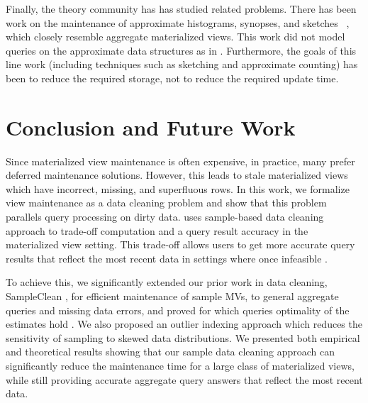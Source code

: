 Finally, the theory community has has studied related problems.
There has been work on the maintenance of approximate histograms, synopses, and sketches ~\cite{gibbons1997fast, DBLP:journals/ftdb/CormodeGHJ12}, which closely resemble aggregate materialized views.
This work did not model queries on the approximate data structures as in \svc.
Furthermore, the goals of this line work (including techniques such as sketching and approximate counting) has been to reduce the required storage, not to reduce the required update time.

\vspace{-1em}
\section{Conclusion and Future Work}\label{conclusion}
\vspace{-.3em}
Since materialized view maintenance is often expensive, in practice, many prefer deferred maintenance solutions.
However, this leads to stale materialized views which have incorrect, missing, and superfluous rows.
In this work, we formalize view maintenance as a data cleaning problem and show that this problem parallels query processing on dirty data.
\svc uses sample-based data cleaning approach to trade-off computation and a query result accuracy in the materialized view setting.
This trade-off allows users to get more accurate query results that reflect the most recent data in settings where once infeasible .


\reminder{<}To achieve this, we significantly extended our prior work in data cleaning, SampleClean \cite{wang1999sample}, for efficient maintenance of sample MVs, to general aggregate queries and missing data errors, and proved for which queries optimality of the estimates hold .
We also proposed an outlier indexing approach which reduces the sensitivity of sampling to skewed data distributions.
We presented both empirical and theoretical results showing that our sample data cleaning approach can significantly reduce the maintenance time for a large class of materialized views, while still providing accurate aggregate query answers that reflect the most recent data.

